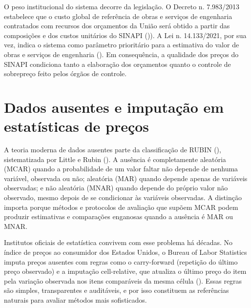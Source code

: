 O peso institucional do sistema decorre da legislação. O Decreto n. 7.983/2013 
estabelece que o custo global de referência de obras e serviços de engenharia contratados 
com recursos dos orçamentos da União será obtido a partir das composições e dos custos 
unitários do SINAPI ()). A Lei n. 14.133/2021, por sua vez, indica o sistema 
como parâmetro prioritário para a estimativa do valor de obras e serviços de engenharia 
(). Em consequência, a qualidade dos preços do SINAPI condiciona tanto a 
elaboração dos orçamentos quanto o controle de sobrepreço feito pelos órgãos de controle.

\section{Dados ausentes e imputação em estatísticas de preços}

A teoria moderna de dados ausentes parte da classificação de RUBIN (), sistematizada 
por Little e Rubin (). A ausência é completamente aleatória (MCAR) quando a 
probabilidade de um valor faltar não depende de nenhuma variável, observada ou não; 
aleatória (MAR) quando depende apenas de variáveis observadas; e não aleatória (MNAR) 
quando depende do próprio valor não observado, mesmo depois de se condicionar às variáveis 
observadas. A distinção importa porque métodos e protocolos de avaliação que supõem MCAR 
podem produzir estimativas e comparações enganosas quando a ausência é MAR ou MNAR.

Institutos oficiais de estatística convivem com esse problema há décadas. No índice de 
preços ao consumidor dos Estados Unidos, o Bureau of Labor Statistics imputa preços 
ausentes com regras como o carry-forward (repetição do último preço observado) e a 
imputação cell-relative, que atualiza o último preço do item pela variação observada nos 
itens comparáveis da mesma célula (). Essas regras 
são simples, transparentes e auditáveis, e por isso constituem as referências naturais 
para avaliar métodos mais sofisticados.

